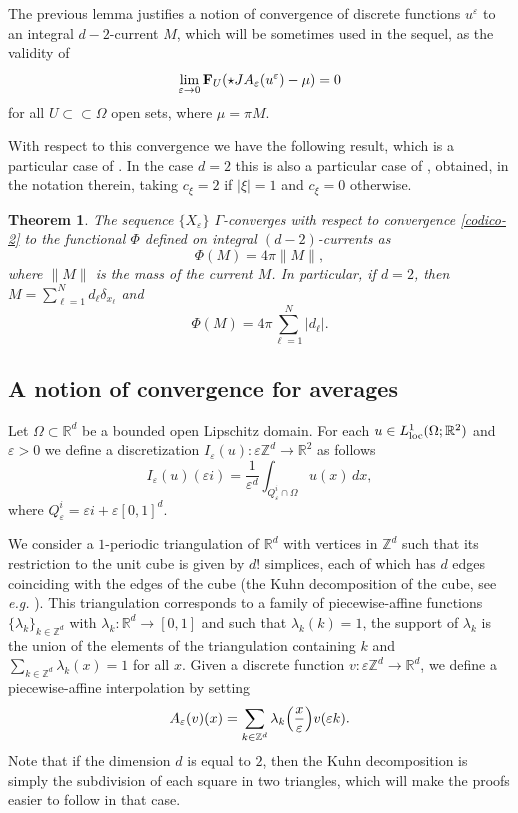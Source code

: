 \documentclass[11pt]{article}
\newtheorem{theorem}[definition]{Theorem}
\def\e{\varepsilon}
\begin{document}
The previous lemma justifies a notion of convergence of discrete functions $u^\e$ to an integral $d-2$-current 
$M$, which will be sometimes used in the sequel, as the validity of
\begin{equation}\label{codico-2}
\lim_{\e\to 0}{\bf F}_U(\star JA_{\e}(u^{\e})-\mu)=0 
\end{equation}
 for all $U\subset\subset\Omega$ open sets, where $\mu=\pi M$.

With respect to this convergence we have the following result, which is a particular case of \cite[Theorem 3]{AC}.  
In the case $d=2$ this is also a particular case of \cite[Theorem 5]{AC}, obtained, in the notation therein, taking $c_\xi= 2$ if $|\xi|=1$ and $c_\xi= 0$ otherwise.

\begin{theorem}\label{theorem3}
The sequence $\{X_\e\}$ $\Gamma$-converges 
with respect to convergence \eqref{codico-2} to the functional $\Phi$ defined on integral $(d-2)$-currents as
$$\Phi(M)=4\pi \|M\|,$$ 
where $\|M\|$ is the mass of the current $M$. 
In particular, if $d=2$, then $M=\sum_{\ell=1}^N d_\ell \delta_{x_\ell}$ and   
$$\Phi(M)=4\pi \sum_{\ell=1}^N |d_\ell|.$$ 
\end{theorem}

\subsection{A notion of convergence for averages}\label{2comp} 
Let $\Omega\subset \mathbb R^d$ be a bounded open Lipschitz domain. For each $u\in L^1_{\rm loc}(\Omega; \mathbb R^2)$ and $\e>0$ we define a discretization $I_\e(u)\colon\e\mathbb Z^d\to\mathbb R^2$ as follows
\begin{equation}\label{def-ie}
I_\e(u)(\e i)=\frac{1}{\e^d}\int_{Q_\e^i\cap \Omega}u(x)\, dx,
\end{equation}
where $Q_\e^i=\e  i +\e[0,1]^d$. 

We consider  
a $1$-periodic triangulation of $\mathbb R^d$ with vertices in $\mathbb Z^d$  
such that its restriction to the unit cube is given by $d!$ simplices, each of which has $d$ edges coinciding with the edges of the cube (the Kuhn decomposition of the cube, see {\em e.g.} \cite[Lemma 1]{kuhn}). 
This triangulation corresponds to a family of piecewise-affine functions $\{\lambda_k\}_{k\in\mathbb Z^d}$ with $\lambda_k\colon\mathbb R^d\to[0,1]$ and such that $\lambda_k(k)=1$, the support of $\lambda_k$ is the union of the elements of the triangulation containing $k$ and $\sum_{k\in\mathbb Z^d}\lambda_k(x)=1$ for all $x$. 
Given a discrete function $v\colon\e \mathbb Z^d\to\mathbb R^d$, we define a piecewise-affine interpolation by setting
\begin{equation}\label{def-ae}
A_\e(v)(x)=\sum_{k\in\mathbb Z^d}\lambda_k\Big({x\over\e}\Big) v(\e k). 
\end{equation} 
Note that if the dimension $d$ is equal to $2$, then the Kuhn decomposition is simply the subdivision of each square in two triangles, which will make the proofs easier to follow in that case.   
\end{document}
